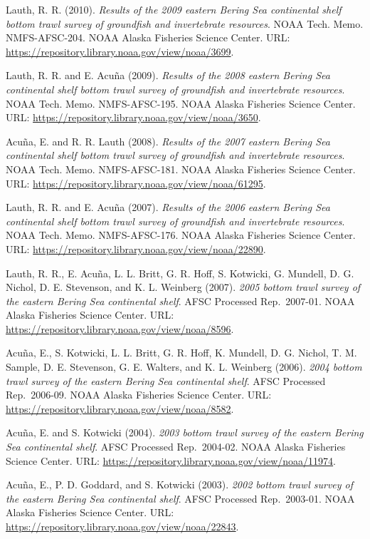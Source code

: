 \documentclass[
  letterpaper,
  oneside,
  open=any]{scrbook}
\begin{document}
Lauth, R. R. (2010). \emph{Results of the 2009 eastern Bering Sea
continental shelf bottom trawl survey of groundfish and invertebrate
resources}. NOAA Tech. Memo. NMFS-AFSC-204. NOAA Alaska Fisheries
Science Center. URL:
\url{https://repository.library.noaa.gov/view/noaa/3699}.

Lauth, R. R. and E. Acuña (2009). \emph{Results of the 2008 eastern
Bering Sea continental shelf bottom trawl survey of groundfish and
invertebrate resources}. NOAA Tech. Memo. NMFS-AFSC-195. NOAA Alaska
Fisheries Science Center. URL:
\url{https://repository.library.noaa.gov/view/noaa/3650}.

Acuña, E. and R. R. Lauth (2008). \emph{Results of the 2007 eastern
Bering Sea continental shelf bottom trawl survey of groundfish and
invertebrate resources}. NOAA Tech. Memo. NMFS-AFSC-181. NOAA Alaska
Fisheries Science Center. URL:
\url{https://repository.library.noaa.gov/view/noaa/61295}.

Lauth, R. R. and E. Acuña (2007). \emph{Results of the 2006 eastern
Bering Sea continental shelf bottom trawl survey of groundfish and
invertebrate resources}. NOAA Tech. Memo. NMFS-AFSC-176. NOAA Alaska
Fisheries Science Center. URL:
\url{https://repository.library.noaa.gov/view/noaa/22890}.

Lauth, R. R., E. Acuña, L. L. Britt, G. R. Hoff, S. Kotwicki, G.
Mundell, D. G. Nichol, D. E. Stevenson, and K. L. Weinberg (2007).
\emph{2005 bottom trawl survey of the eastern Bering Sea continental
shelf}. AFSC Processed Rep.~2007-01. NOAA Alaska Fisheries Science
Center. URL: \url{https://repository.library.noaa.gov/view/noaa/8596}.

Acuña, E., S. Kotwicki, L. L. Britt, G. R. Hoff, K. Mundell, D. G.
Nichol, T. M. Sample, D. E. Stevenson, G. E. Walters, and K. L. Weinberg
(2006). \emph{2004 bottom trawl survey of the eastern Bering Sea
continental shelf}. AFSC Processed Rep.~2006-09. NOAA Alaska Fisheries
Science Center. URL:
\url{https://repository.library.noaa.gov/view/noaa/8582}.

Acuña, E. and S. Kotwicki (2004). \emph{2003 bottom trawl survey of the
eastern Bering Sea continental shelf}. AFSC Processed Rep.~2004-02. NOAA
Alaska Fisheries Science Center. URL:
\url{https://repository.library.noaa.gov/view/noaa/11974}.

Acuña, E., P. D. Goddard, and S. Kotwicki (2003). \emph{2002 bottom
trawl survey of the eastern Bering Sea continental shelf}. AFSC
Processed Rep.~2003-01. NOAA Alaska Fisheries Science Center. URL:
\url{https://repository.library.noaa.gov/view/noaa/22843}.
\end{document}
